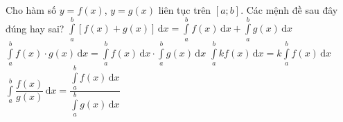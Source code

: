 \begin{ex}%
	Cho hàm số $y=f(x)$, $y=g(x)$ liên tục trên $\left[a;b\right]$. Các mệnh đề sau đây đúng hay sai?
	\choiceTF
	{\True $\displaystyle\int\limits_a^b{\left[f(x)+g(x)\right]\mathrm{\,d}x}=\displaystyle\int\limits_a^b{f(x)}\mathrm{\,d}x+\displaystyle\int\limits_a^b{g(x)\mathrm{\,d}x}$}
	{$\displaystyle\int\limits_a^b{f(x)\cdot g(x)\mathrm{\,d}x}=\displaystyle\int\limits_a^b{f(x)\mathrm{\,d}x}\cdot\displaystyle\int\limits_a^b{g(x)\mathrm{\,d}x}$}
	{\True $\displaystyle\int\limits_a^b{kf(x)\mathrm{\,d}x=k\displaystyle\int\limits_a^b{f(x)\mathrm{\,d}x}}$}
	{$\displaystyle\int\limits_a^b{\dfrac{f(x)}{g(x)}\mathrm{\,d}x}=\dfrac{\displaystyle\int\limits_a^bf(x)\mathrm{\,d}x}{\displaystyle\int\limits_a^bg(x)\mathrm{\,d}x}$}
\end{ex}
%
